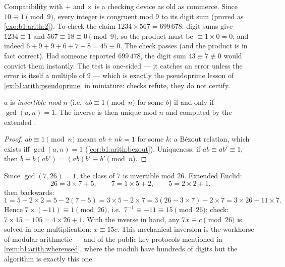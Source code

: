 \begin{example}\label{ex:b1:arith:castingnines}
Compatibility with $+$ and $\times$ is a checking device as old
as commerce. Since $10 \equiv 1 \pmod 9$, every integer is
congruent mod $9$ to its digit sum (proved as
\cref{exo:b1:arith:2}). To check the claim $1234 \times 567 =
699\,678$: digit sums give $1234 \equiv 1$ and $567 \equiv 18
\equiv 0 \pmod 9$, so the product must be $\equiv 1 \times 0 =
0$; and indeed $6 + 9 + 9 + 6 + 7 + 8 = 45 \equiv 0$. The check
passes (and the product is in fact correct). Had someone reported
$699\,478$, the digit sum $43 \equiv 7 \not\equiv 0$ would
convict them instantly. The test is one-sided --- it catches an
error unless the error is itself a multiple of $9$ --- which is
exactly the pseudoprime lesson of
\cref{ex:b1:arith:pseudoprime} in miniature:  checks
refute, they do not certify.
\end{example}

\begin{proposition}\label{prop:b1:arith:invmod}
$a$ is \emph{invertible mod $n$} (i.e.\ $ab \equiv 1 \pmod n$ for some
$b$) if and only if $\gcd(a, n) = 1$. The inverse is then unique mod
$n$ and computed by the extended .
\end{proposition}

\begin{proof}
$ab \equiv 1 \pmod n$ means $ab + nk = 1$ for some $k$: a Bézout
relation, which exists iff $\gcd(a,n) = 1$
(\cref{cor:b1:arith:bezout}). Uniqueness: if $ab \equiv ab' \equiv 1$,
then $b \equiv b(ab') = (ab)b' \equiv b' \pmod n$.
\end{proof}

\begin{example}\label{ex:b1:arith:inv7mod26}
Since $\gcd(7, 26) = 1$, the class of $7$ is invertible mod $26$.
Extended Euclid:
\[
26 = 3 \times 7 + 5, \qquad
7 = 1 \times 5 + 2, \qquad
5 = 2 \times 2 + 1 ,
\]
then backwards:
\[
1 = 5 - 2 \times 2 = 5 - 2(7 - 5) = 3 \times 5 - 2 \times 7
= 3(26 - 3 \times 7) - 2 \times 7 = 3 \times 26 - 11 \times 7 .
\]
Hence $7 \times (-11) \equiv 1 \pmod{26}$, i.e.\ $7^{-1} \equiv
-11 \equiv 15 \pmod{26}$; check: $7 \times 15 = 105 = 4 \times 26
+ 1$. With the inverse in hand, any  $7x \equiv c
\pmod{26}$ is solved in one multiplication: $x \equiv 15c$. This
mechanical inversion is the workhorse of modular arithmetic ---
and of the public-key protocols mentioned in
\cref{rem:b1:arith:whereused}, where the moduli have hundreds of
digits but the algorithm is exactly this one.
\end{example}

